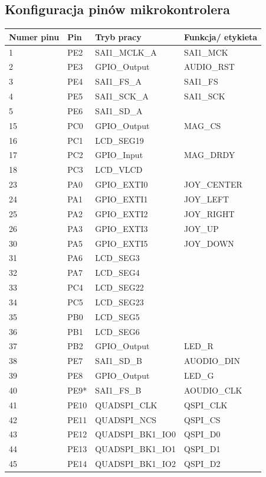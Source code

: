 \documentclass[10pt, a4paper]{article}
\begin{document}
\subsection{Konfiguracja pinów mikrokontrolera}
\begin{table}[H]
\centering
\begin{tabular}{|l|l|l|l|}
\hline
\textbf{Numer pinu} & \textbf{Pin} & \textbf{Tryb pracy} & \textbf{Funkcja/ etykieta} \\ \hline \hline
1&		PE2&		SAI1\_MCLK\_A	&	SAI1\_MCK	\\
2&		PE3	&	GPIO\_Output		&	AUDIO\_RST\\
3&		PE4	&	SAI1\_FS\_A			&	SAI1\_FS\\
4&		PE5	&	SAI1\_SCK\_A		&	SAI1\_SCK\\
5&		PE6	&	SAI1\_SD\_A	& \\
15&		PC0	&	GPIO\_Output		&	MAG\_CS\\
16&		PC1	&	LCD\_SEG19	& \\
17&		PC2	&	GPIO\_Input	&		MAG\_DRDY\\
18	&	PC3	&	LCD\_VLCD	& \\
23&		PA0	&	GPIO\_EXTI0	&		JOY\_CENTER\\
24	&	PA1	&	GPIO\_EXTI1	&		JOY\_LEFT\\
25&		PA2	&	GPIO\_EXTI2	&		JOY\_RIGHT\\
26	&	PA3	&	GPIO\_EXTI3	&		JOY\_UP\\
30&		PA5	&	GPIO\_EXTI5	&		JOY\_DOWN\\
31	&	PA6	&	LCD\_SEG3	&	\\
32	&	PA7	&	LCD\_SEG4	&	\\
33	&	PC4	&	LCD\_SEG22	&	\\
34	&	PC5	&	LCD\_SEG23	&	\\
35	&	PB0	&	LCD\_SEG5	&	\\
36	&	PB1	&	LCD\_SEG6	&	\\
37	&	PB2	&	GPIO\_Output	&		LED\_R\\
38	&	PE7	&	SAI1\_SD\_B	&		AUODIO\_DIN\\
39	&	PE8	&	GPIO\_Output	&		LED\_G\\
40	&	PE9*&	SAI1\_FS\_B	&		AOUDIO\_CLK\\
41	&	PE10&	QUADSPI\_CLK	&		QSPI\_CLK\\
42	&	PE11&	QUADSPI\_NCS	&		QSPI\_CS\\
43	&	PE12&	QUADSPI\_BK1\_IO0&		QSPI\_D0\\
44	&	PE13&	QUADSPI\_BK1\_IO1	&	QSPI\_D1\\
45	&	PE14&	QUADSPI\_BK1\_IO2	&	QSPI\_D2\\

\end{tabular}
\end{table}
\end{document}
